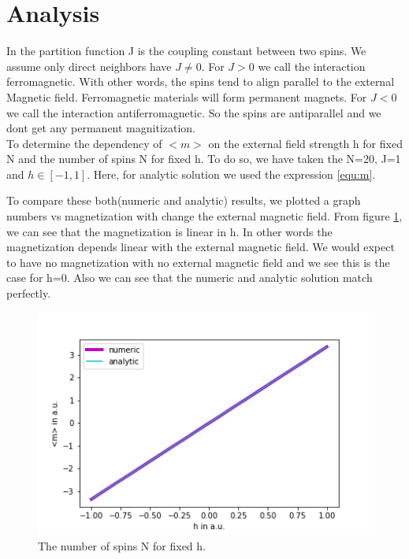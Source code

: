 \documentclass[11pt, a4paper, DIV=12]{scrartcl}
\begin{document}
\section{Analysis}
In the partition function J is the coupling constant between two spins. We assume only direct neighbors have $J\neq 0$. For $J>0$ we call the interaction ferromagnetic. With other words, the spins tend to align parallel to the external Magnetic field. Ferromagnetic materials will form permanent magnets. For $J<0$ we call the interaction antiferromagnetic. So the spins are antiparallel and we dont get any permanent magnitization.\\

To determine the dependency of $ <m> $ on the external field strength h for fixed N and the number of spins N for fixed h. To do so, we have taken the N=20, J=1 and $h \in [-1, 1]$. Here, for analytic solution we used the expression \ref{equ:m}.

To compare these both(numeric and analytic) results, we plotted a graph numbers vs magnetization with change the external magnetic field. From figure \ref{fig:Nconst}, we can see that the magnetization is linear in h. In other words the magnetization depends linear with the external magnetic field. We would expect to have no magnetization with no external magnetic field and we see this is the case for h=0. Also we can see that the numeric and analytic solution match perfectly.
\begin{figure}[H]
	\centering
	\includegraphics[width=0.8\linewidth]{Nconst.png}
	\caption{The number of spins N for fixed h.}
	\label{fig:Nconst}
\end{figure}
\end{document}
